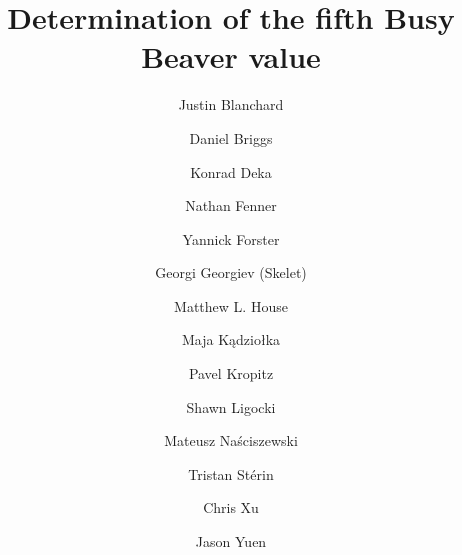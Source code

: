\documentclass[sigconf,screen]{acmart}
\theoremstyle{definition} %
\numberwithin{equation}{section}
\theoremstyle{definition} %
\begin{document}
\title{Determination of the fifth Busy Beaver value}


\author{Justin Blanchard}

\author{Daniel Briggs}

\author{Konrad Deka}

\author{Nathan Fenner}

\author{Yannick Forster}

\author{Georgi Georgiev (Skelet)}

\author{Matthew L. House}



\author{Maja K\k{a}dzio{\l}ka}

\author{Pavel Kropitz}

\author{Shawn Ligocki}


\author{Mateusz Na\'{s}ciszewski}


\author{Tristan St\'erin}

\author{Chris Xu}

\author{Jason Yuen}
\end{document}
